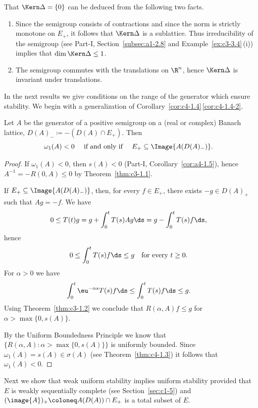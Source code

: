 That $\Kern\Delta = \{0\}$ can be deduced from the following two facts.
\begin{enumerate}[\upshape (i), wide, labelindent=.25em]
\item 
Since the semigroup consists of contractions and since the norm is strictly monotone on $E_{+}$, it follows that $\Kern\Delta$ is a sublattice.
Thus irreducibility of the semigroup (see Part-I, Section~\ref{subsec:a1-2.8} and Example~\ref{ex:c3-3.4}\,(i)) implies that $\dim \Kern\Delta \leq 1$.

\item 
The semigroup commutes with the translations on $\R^{n}$, hence $\Kern\Delta$ is invariant under translations.

\end{enumerate}
In the next results we give conditions on the range of the generator which ensure stability.
We begin with a generalization of Corollary~\ref{cor:c4-1.4}\,\ref{cor:c4-1.4-2}.
\begin{proposition}\label{prop:c4-1.6}
%
Let $A$ be the generator of a positive semigroup on a (real or complex) Banach lattice, $D(A)_{-} \coloneq -(D(A) \cap E_{+})$.
Then 
\[ 
\text{$\omega_{1}(A) < 0 $ \quad \text{if and only if} \quad $E_{+} \subseteq \Image{A(D(A)_{-})}$.}
\]
\end{proposition}
\begin{proof}
If\/ $\omega_{1}(A) < 0$, then $s(A) < 0$ (Part-I, Corollary~\ref{cor:a4-1.5}), hence $A^{-1} = -R(0,A) \leq 0$ by Theorem~\ref{thm:c3-1.1}.

If\/ $E_{+} \subseteq \Image{A(D(A)_{-})}$, then, for every $f \in E_{+}$, there exists $-g \in D(A)_{+}$ such that $Ag = -f$.
We have 
\[
0 \leq T(t)g = g + \int_{0}^{t} T(s)Ag \ds = g - \int_{0}^{t} T(s)f \ds,
\]
hence 
\[
0 \leq \int_{0}^{t} T(s)f \ds \leq g 
\quad \text{for every $t \geq 0$.}
\]
For $\alpha > 0$ we have 
\[
\int_{0}^{t} \eu^{-\alpha s}T(s)f \ds \leq \int_{0}^{t} T(s)f \ds \leq g .
\]
Using Theorem~\ref{thm:c3-1.2}  we conclude that $R(\alpha,A)f \leq g$ for $\alpha > \max\{0,s(A)\}$.

By the Uniform Boundedness Principle we know that $\{R(\alpha,A) \colon \alpha > \max\{0,s(A)\}\}$ is uniformly bounded.
Since $\omega_{1}(A) = s(A) \in \sigma(A)$ (see Theorem~\ref{thm:c4-1.3}) it follows that $\omega_{1}(A) < 0$.
\end{proof}
Next we show that weak uniform stability implies uniform stability provided that $E$ is weakly sequentially complete (see Section~\ref{sec:c1-5}) and $(\image{A})_{+} \coloneq A(D(A)) \cap E_{+}$ is a total subset of\/ $E$.
